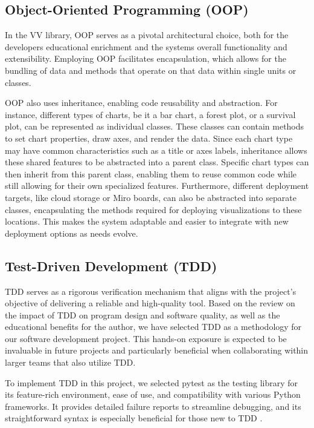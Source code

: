 \subsection{Object-Oriented Programming
(OOP)}\label{object-oriented-programming-oop}

In the VV library, OOP serves as a pivotal architectural choice, both
for the developer\textquotesingle s educational enrichment and the
system\textquotesingle s overall functionality and extensibility.
Employing OOP facilitates encapsulation, which allows for the bundling
of data and methods that operate on that data within single units or
classes.

OOP also uses inheritance, enabling code reusability and abstraction.
For instance, different types of charts, be it a bar chart, a forest
plot, or a survival plot, can be represented as individual classes.
These classes can contain methods to set chart properties, draw axes,
and render the data. Since each chart type may have common
characteristics such as a title or axes labels, inheritance allows these
shared features to be abstracted into a parent class. Specific chart
types can then inherit from this parent class, enabling them to reuse
common code while still allowing for their own specialized features.
Furthermore, different deployment targets, like cloud storage or Miro
boards, can also be abstracted into separate classes, encapsulating the
methods required for deploying visualizations to these locations. This
makes the system adaptable and easier to integrate with new deployment
options as needs evolve.

\subsection{Test-Driven Development
(TDD)}\label{test-driven-development-tdd}

TDD serves as a rigorous verification mechanism that aligns with the
project's objective of delivering a reliable and high-quality tool.
Based on the review on the impact of TDD on program design
and software quality, as well as the educational benefits for the
author, we have selected TDD as a methodology for our software
development project. This hands-on exposure is expected to be invaluable in future projects
and particularly beneficial when collaborating within larger teams that
also utilize TDD.

To implement TDD in this project, we selected pytest as the testing
library for its feature-rich environment, ease of use, and compatibility
with various Python frameworks. It provides detailed failure reports to
streamline debugging, and its straightforward syntax is especially
beneficial for those new to TDD
\cite{40}.

